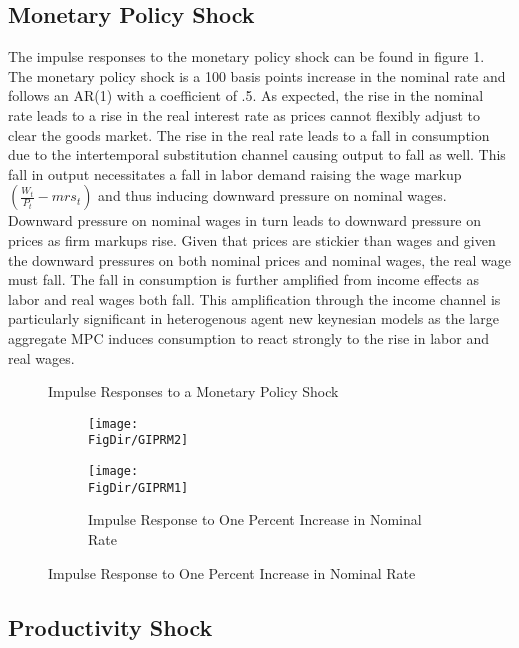 \documentclass[titlepage]{\econtex}\providecommand{\texname}{FBS-NK}
\providecommand{\FigDir}{Figures}
\begin{document}
\hypertarget{Monetary Policy Shock}{}
\subsection{Monetary Policy Shock}

The impulse responses to the monetary policy shock can be found in figure 1. The monetary policy shock is a 100 basis points increase in the nominal rate and follows an AR(1) with a coefficient of .5.  As expected, the rise in the nominal rate leads to a rise in the real interest rate as prices cannot flexibly adjust to clear the goods market. The rise in the real rate leads to a fall in consumption due to the intertemporal substitution channel  causing output to fall as well. This fall in output necessitates a fall in labor demand raising the wage markup $(\frac{W_{t}}{P_{t}} - mrs_{t})$ and thus inducing downward pressure on nominal wages. Downward pressure on nominal wages in turn leads to downward pressure on prices as firm markups rise. Given that prices are stickier than wages and given the downward pressures on both nominal prices and nominal wages, the real wage must fall. The fall in consumption is further amplified from income effects as labor and real wages both fall.  This amplification through the income channel is particularly significant in heterogenous agent new keynesian models as the large aggregate MPC induces consumption to react strongly to the rise in labor and real wages. 


\begin{figure}{Impulse Responses to a Monetary Policy Shock}
  \begin{subfigure}{}
    \centering\texttt{[image: \\FigDir/GIPRM2]}
  \end{subfigure}
  \begin{subfigure}{}
    \centering\texttt{[image: \\FigDir/GIPRM1]}
    \caption{ Impulse Response to One Percent Increase in Nominal Rate}
  \end{subfigure}
\end{figure}


\hypertarget{Productivity Shock}{}
\subsection{Productivity Shock}
\end{document}
